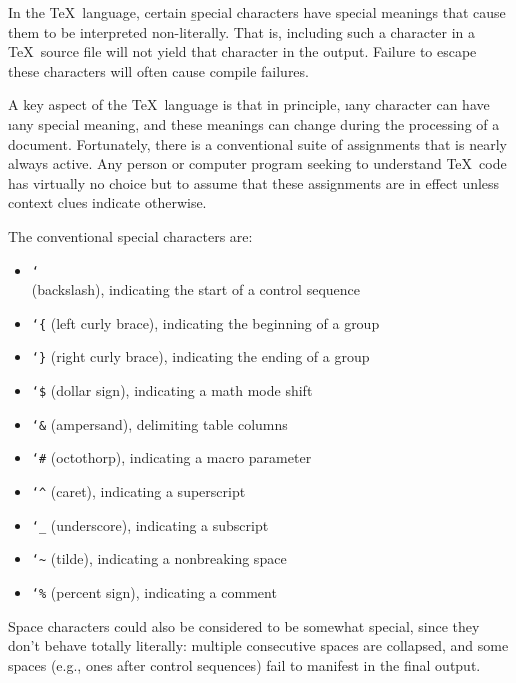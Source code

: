 
In the \TeX\ language, certain \b{special characters} have special meanings that
cause them to be interpreted non-literally. That is, including such a character
in a \TeX\ source file will not yield that character in the output. Failure to
escape these characters will often cause compile failures.

A key aspect of the \TeX\ language is that in principle, \i{any character} can
have \i{any} special meaning, and these meanings can change during the
processing of a document. Fortunately, there is a conventional suite of
assignments that is nearly always active. Any person or computer program seeking
to understand \TeX\ code has virtually no choice but to assume that these
assignments are in effect unless context clues indicate otherwise.

The conventional special characters are:
\begin{itemize}
    \item \b{\texttt{\char`\\} (backslash)}, indicating the start of a control sequence
    \item \b{\texttt{\char`\{} (left curly brace)}, indicating the beginning of a group
    \item \b{\texttt{\char`\}} (right curly brace)}, indicating the ending of a group
    \item \b{\texttt{\char`\$} (dollar sign)}, indicating a math mode shift
    \item \b{\texttt{\char`\&} (ampersand)}, delimiting table columns
    \item \b{\texttt{\char`\#} (octothorp)}, indicating a macro parameter
    \item \b{\texttt{\char`\^} (caret)}, indicating a superscript
    \item \b{\texttt{\char`\_} (underscore)}, indicating a subscript
    \item \b{\texttt{\char`\~} (tilde)}, indicating a nonbreaking space
    \item \b{\texttt{\char`\%} (percent sign)}, indicating a comment
\end{itemize}
Space characters could also be considered to be somewhat special, since they
don’t behave totally literally: multiple consecutive spaces are collapsed, and
some spaces (e.g., ones after control sequences) fail to manifest in the final
output.

